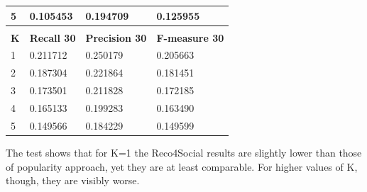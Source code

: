 \documentclass[12pt]{report}
\begin{document}
\begin{table}[htpb]
\begin{tabular}{llll}
\multicolumn{1}{|l|}{5}       & \multicolumn{1}{l|}{0.105453}        & \multicolumn{1}{l|}{0.194709}           & \multicolumn{1}{l|}{0.125955}           \\ \hline
                              &                                      &                                         &                                         \\ \hline
\multicolumn{1}{|l|}{{\bf K}} & \multicolumn{1}{l|}{{\bf Recall 30}} & \multicolumn{1}{l|}{{\bf Precision 30}} & \multicolumn{1}{l|}{{\bf F-measure 30}} \\ \hline
\multicolumn{1}{|l|}{1}       & \multicolumn{1}{l|}{0.211712}        & \multicolumn{1}{l|}{0.250179}           & \multicolumn{1}{l|}{0.205663}           \\ \hline
\multicolumn{1}{|l|}{2}       & \multicolumn{1}{l|}{0.187304}        & \multicolumn{1}{l|}{0.221864}           & \multicolumn{1}{l|}{0.181451}           \\ \hline
\multicolumn{1}{|l|}{3}       & \multicolumn{1}{l|}{0.173501}        & \multicolumn{1}{l|}{0.211828}           & \multicolumn{1}{l|}{0.172185}           \\ \hline
\multicolumn{1}{|l|}{4}       & \multicolumn{1}{l|}{0.165133}        & \multicolumn{1}{l|}{0.199283}           & \multicolumn{1}{l|}{0.163490}           \\ \hline
\multicolumn{1}{|l|}{5}       & \multicolumn{1}{l|}{0.149566}        & \multicolumn{1}{l|}{0.184229}           & \multicolumn{1}{l|}{0.149599}           \\ \hline
\end{tabular}
\end{table}

The test shows that for K=1 the Reco4Social results are slightly lower than those of popularity approach, yet they are at least comparable. For higher values of K, though, they are visibly worse.
\end{document}
